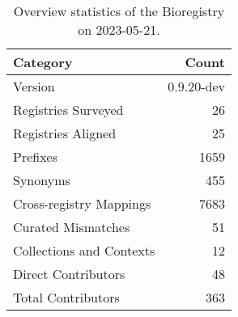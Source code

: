 \begin{table}
\caption{Overview statistics of the Bioregistry on 2023-05-21.}
\label{tab:bioregistry-summary}
\begin{tabular}{lr}
\toprule
Category & Count \\
\midrule
Version & 0.9.20-dev \\
Registries Surveyed & 26 \\
Registries Aligned & 25 \\
Prefixes & 1659 \\
Synonyms & 455 \\
Cross-registry Mappings & 7683 \\
Curated Mismatches & 51 \\
Collections and Contexts & 12 \\
Direct Contributors & 48 \\
Total Contributors & 363 \\
\bottomrule
\end{tabular}
\end{table}

